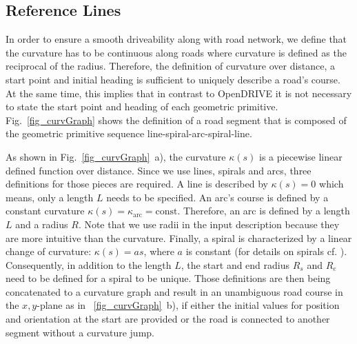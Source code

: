 \documentclass[a4paper, 10pt, conference]{ieeeconf}      %
\begin{document}
\subsection{Reference Lines} \label{sec_refline} %
In order to ensure a smooth driveability along with road network, we define that the curvature has to be continuous along roads where curvature is defined as the reciprocal of the radius. Therefore, the definition of curvature over distance, a start point and initial heading is sufficient to uniquely describe a road's course. At the same time, this implies that in contrast to OpenDRIVE it is not necessary to state the start point and heading of each geometric primitive. Fig.~\ref{fig_curvGraph} shows the definition of a road segment that is composed of the geometric primitive sequence line-spiral-arc-spiral-line.

As shown in Fig.~\ref{fig_curvGraph}~a), the curvature $\kappa(s)$ is a piecewise linear defined function over distance. Since we use lines, spirals and arcs, three definitions for those pieces are required. A line is described by $\kappa(s) = 0$ which means, only a length $L$ needs to be specified. An arc's course is defined by a constant curvature $\kappa(s) = \kappa_\text{arc} = \text{const}$. Therefore, an arc is defined by a length $L$ and a radius $R$. Note that we use radii in the input description because they are more intuitive than the curvature. Finally, a spiral is characterized by a linear change of curvature: $\kappa(s) = a s$, where $a$ is constant (for details on spirals cf. \cite{Baier.2008}). Consequently, in addition to the length $L$, the start and end radius $R_s$ and $R_e$ need to be defined for a spiral to be unique. Those definitions are then being concatenated to a curvature graph and result in an unambiguous road course in the $x,y$-plane as in ~\ref{fig_curvGraph}~b), if either the initial values for position and orientation at the start are provided or the road is connected to another segment without a curvature jump.
\end{document}
